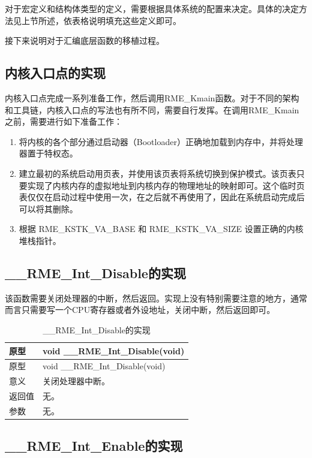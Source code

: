 对于宏定义和结构体类型的定义，需要根据具体系统的配置来决定。具体的决定方法见上节所述，依表格说明填充这些定义即可。

接下来说明对于汇编底层函数的移植过程。

\subsection{内核入口点的实现}\label{subsec:7-kernel-entry-point-implementation}

内核入口点完成一系列准备工作，然后调用RME\_Kmain函数。对于不同的架构和工具链，内核入口点的写法也有所不同，需要自行发挥。在调用RME\_Kmain之前，需要进行如下准备工作：

\begin{enumerate}
\def\labelenumi{\arabic{enumi}.}
\item
  将内核的各个部分通过启动器（Bootloader）正确地加载到内存中，并将处理器置于特权态。
\item
  建立最初的系统启动用页表，并使用该页表将系统切换到保护模式。该页表只要实现了内核内存的虚拟地址到内核内存的物理地址的映射即可。这个临时页表仅仅在启动过程中使用一次，在之后就不再使用了，因此在系统启动完成后可以将其删除。
\item
  根据 RME\_KSTK\_VA\_BASE 和 RME\_KSTK\_VA\_SIZE 设置正确的内核堆栈指针。
\end{enumerate}

\subsection{\_\_RME\_Int\_Disable的实现}\label{subsec:7-rme-int-disable-implementation}

该函数需要关闭处理器的中断，然后返回。实现上没有特别需要注意的地方，通常而言只需要写一个CPU寄存器或者外设地址，关闭中断，然后返回即可。

\begin{xltabular}{\textwidth}{@{}>{\hsize\raggedright\arraybackslash}X>{\hsize\raggedright\arraybackslash}X@{}}
\caption{\_\_RME\_Int\_Disable的实现}\label{tab:7-16-rme-int-disable-implementation}\\
\toprule
原型 & void \_\_RME\_Int\_Disable(void)\tabularnewline
\endfirsthead
\toprule
原型 & void \_\_RME\_Int\_Disable(void)\tabularnewline
\midrule
\endhead
\bottomrule
\endlastfoot
意义 & 关闭处理器中断。\tabularnewline
返回值 & 无。\tabularnewline
参数 & 无。\tabularnewline
\end{xltabular}

\subsection{\_\_RME\_Int\_Enable的实现}\label{subsec:7-rme-int-enable-implementation}

